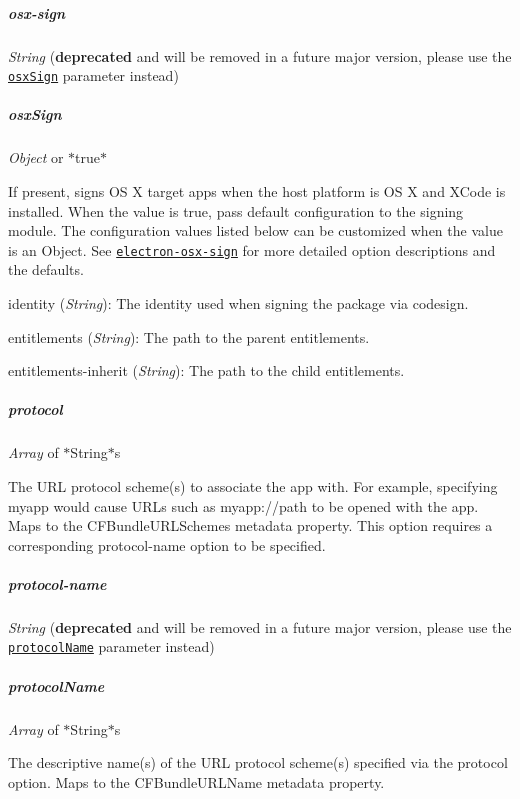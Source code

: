 \subparagraph*{{\ttfamily osx-\/sign}}

{\itshape String} ({\bfseries deprecated} and will be removed in a future major version, please use the \href{#osxsign}{\tt {\ttfamily osx\+Sign}} parameter instead)

\subparagraph*{{\ttfamily osx\+Sign}}

{\itshape Object} or $\ast${\ttfamily true}$\ast$

If present, signs OS X target apps when the host platform is OS X and X\+Code is installed. When the value is {\ttfamily true}, pass default configuration to the signing module. The configuration values listed below can be customized when the value is an {\ttfamily Object}. See \href{https://www.npmjs.com/package/electron-osx-sign#opts}{\tt electron-\/osx-\/sign} for more detailed option descriptions and the defaults.
\begin{DoxyItemize}
\item {\ttfamily identity} ({\itshape String})\+: The identity used when signing the package via {\ttfamily codesign}.
\item {\ttfamily entitlements} ({\itshape String})\+: The path to the \textquotesingle{}parent\textquotesingle{} entitlements.
\item {\ttfamily entitlements-\/inherit} ({\itshape String})\+: The path to the \textquotesingle{}child\textquotesingle{} entitlements.
\end{DoxyItemize}

\subparagraph*{{\ttfamily protocol}}

{\itshape Array} of $\ast$\+String$\ast$​s

The U\+RL protocol scheme(s) to associate the app with. For example, specifying {\ttfamily myapp} would cause U\+R\+Ls such as {\ttfamily myapp\+://path} to be opened with the app. Maps to the {\ttfamily C\+F\+Bundle\+U\+R\+L\+Schemes} metadata property. This option requires a corresponding {\ttfamily protocol-\/name} option to be specified.

\subparagraph*{{\ttfamily protocol-\/name}}

{\itshape String} ({\bfseries deprecated} and will be removed in a future major version, please use the \href{#protocolname}{\tt {\ttfamily protocol\+Name}} parameter instead)

\subparagraph*{{\ttfamily protocol\+Name}}

{\itshape Array} of $\ast$\+String$\ast$​s

The descriptive name(s) of the U\+RL protocol scheme(s) specified via the {\ttfamily protocol} option. Maps to the {\ttfamily C\+F\+Bundle\+U\+R\+L\+Name} metadata property.

